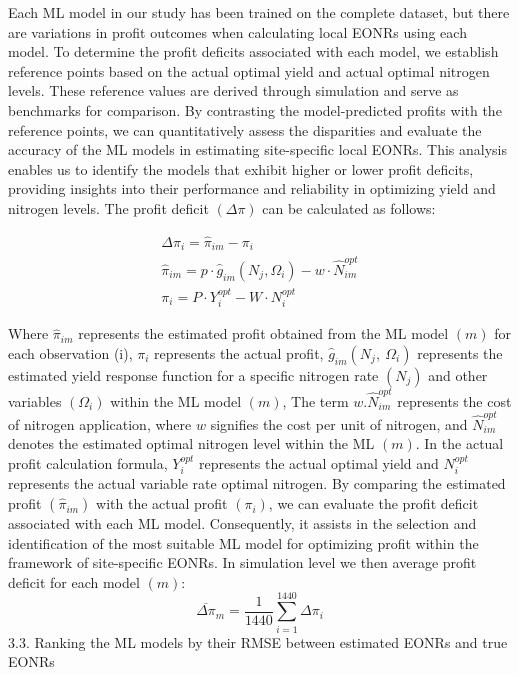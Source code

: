 \documentclass[
  12pt,
]{article}
\begin{document}
Each ML model in our study has been trained on the complete dataset, but there are variations in profit outcomes when calculating local EONRs using each model. To determine the profit deficits associated with each model, we establish reference points based on the actual optimal yield and actual optimal nitrogen levels. These reference values are derived through simulation and serve as benchmarks for comparison.
By contrasting the model-predicted profits with the reference points, we can quantitatively assess the disparities and evaluate the accuracy of the ML models in estimating site-specific local EONRs. This analysis enables us to identify the models that exhibit higher or lower profit deficits, providing insights into their performance and reliability in optimizing yield and nitrogen levels. The profit deficit \((\Delta \pi)\) can be calculated as follows:

\[
\begin{gathered}
\Delta \pi_i=\hat{\pi}_{i m}-\pi_i \\
\hat{\pi}_{i m}=p \cdot \hat{g}_{i m}\left(N_j, \Omega_i\right)-w \cdot \widehat{N}_{i m}^{o p t} \\
\pi_i=P \cdot Y_i^{o p t}-W \cdot N_i^{o p t}
\end{gathered}
\]

Where \({\hat{\pi}}_{im}\) represents the estimated profit obtained from the ML model \((m)\) for each observation (i), \(\pi_i\) represents the actual profit, \({\hat{g}}_{im}(N_j,\ \Omega_i)\) represents the estimated yield response function for a specific nitrogen rate \((N_j)\) and other variables \((\Omega_i)\) within the ML model \((m)\), The term \(w.{\hat{N}}_{im}^{opt}\) represents the cost of nitrogen application, where \(w\) signifies the cost per unit of nitrogen, and \({\hat{N}}_{im}^{opt}\) denotes the estimated optimal nitrogen level within the ML \((m)\).
In the actual profit calculation formula, \(Y_i^{opt}\) represents the actual optimal yield and \(N_i^{opt}\) represents the actual variable rate optimal nitrogen.
By comparing the estimated profit \(({\hat{\pi}}_{im})\) with the actual profit \((\pi_i)\), we can evaluate the profit deficit associated with each ML model. Consequently, it assists in the selection and identification of the most suitable ML model for optimizing profit within the framework of site-specific EONRs. In simulation level we then average profit deficit for each model \((m)\):
\[
\overline{\Delta \pi}_m=\frac{1}{1440} \sum_{i=1}^{1440} \Delta \pi_i
\]
3.3. Ranking the ML models by their RMSE between estimated EONRs and true EONRs
\end{document}
